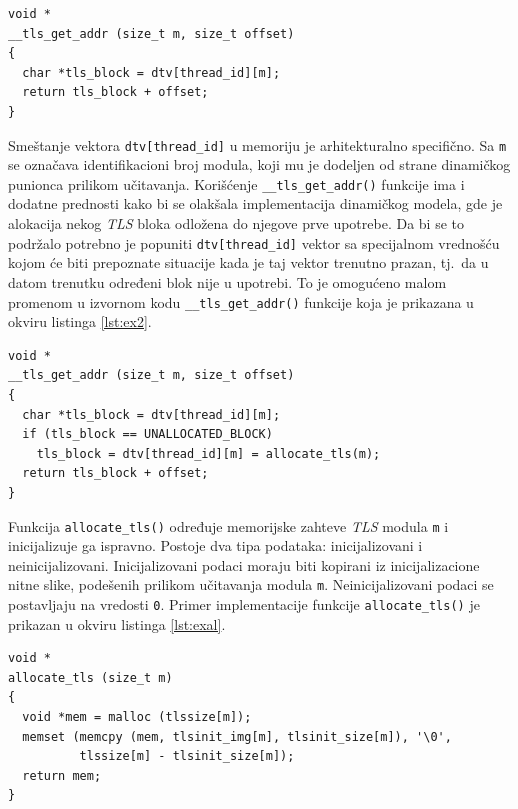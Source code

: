 \documentclass[12pt,oneside]{memoir}
\begin{document}
\begin{lstlisting}[style=customc, label={lst:ex1}, caption={Implementacija funkcije \texttt{\_\_tls\_get\_addr()}.}]
void *
__tls_get_addr (size_t m, size_t offset)
{
  char *tls_block = dtv[thread_id][m];
  return tls_block + offset;
}

\end{lstlisting}

Smeštanje vektora \texttt{dtv[thread\_id]} u memoriju je arhitekturalno specifično. Sa \texttt{m} se označava identifikacioni broj modula, koji mu je dodeljen od strane dinamičkog punionca prilikom učitavanja. Korišćenje \texttt{\_\_tls\_get\_addr()} funkcije ima i dodatne prednosti kako bi se olakšala implementacija dinamičkog modela, gde je alokacija nekog \emph{TLS} bloka odložena do njegove prve upotrebe. Da bi se to podržalo potrebno je popuniti \texttt{dtv[thread\_id]} vektor sa specijalnom vrednošću kojom će biti prepoznate situacije kada je taj vektor trenutno prazan, tj.~da u datom trenutku određeni blok nije u upotrebi. To je omogućeno malom promenom u izvornom kodu \texttt{\_\_tls\_get\_addr()} funkcije koja je prikazana u okviru listinga \ref{lst:ex2}.\newpage

\begin{lstlisting}[style=customc, label={lst:ex2}, caption={Promena implementacije funkcije \texttt{\_\_tls\_get\_addr()}.}]
void *
__tls_get_addr (size_t m, size_t offset)
{
  char *tls_block = dtv[thread_id][m];
  if (tls_block == UNALLOCATED_BLOCK)
    tls_block = dtv[thread_id][m] = allocate_tls(m);
  return tls_block + offset;
}

\end{lstlisting}

Funkcija \texttt{allocate\_tls()} određuje memorijske zahteve \emph{TLS} modula \texttt{m} i inicijalizuje ga ispravno. Postoje dva tipa podataka: inicijalizovani i neinicijalizovani. Inicijalizovani podaci moraju biti kopirani iz inicijalizacione nitne slike, podešenih prilikom učitavanja modula \texttt{m}. Neinicijalizovani podaci se postavljaju na vredosti \texttt{0}. Primer implementacije funkcije \texttt{allocate\_tls()} je prikazan u okviru listinga \ref{lst:exal}.

\begin{lstlisting}[style=customc, label={lst:exal}, caption={Implementacija funkcije \texttt{allocate\_tls()}.}]
void *
allocate_tls (size_t m)
{
  void *mem = malloc (tlssize[m]);
  memset (memcpy (mem, tlsinit_img[m], tlsinit_size[m]), '\0',
          tlssize[m] - tlsinit_size[m]);
  return mem;
}

\end{lstlisting}
\end{document}
